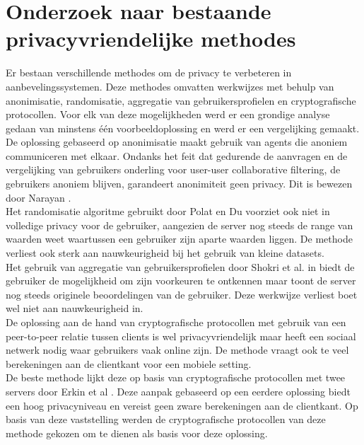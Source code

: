 \documentclass[twocolumn]{phdsymp} %
\begin{document}
\section{Onderzoek naar bestaande privacyvriendelijke methodes}

Er bestaan verschillende methodes om de privacy te verbeteren in aanbevelingssystemen. Deze methodes omvatten werkwijzes met behulp van anonimisatie, randomisatie, aggregatie van gebruikersprofielen en cryptografische protocollen. Voor elk van deze mogelijkheden werd er een grondige analyse gedaan van minstens \'e\'en voorbeeldoplossing en werd er een vergelijking gemaakt. \\ 
De oplossing gebaseerd op anonimisatie \cite{anonimisatie} maakt gebruik van agents die anoniem communiceren met elkaar. Ondanks het feit dat gedurende de aanvragen en de vergelijking van gebruikers onderling voor user-user collaborative filtering, de gebruikers anoniem blijven, garandeert anonimiteit geen privacy. Dit is bewezen door Narayan \cite{anon}.\\Het randomisatie algoritme gebruikt door Polat en Du \cite{rand} voorziet ook niet in volledige privacy voor de gebruiker, aangezien de server nog steeds de range van waarden weet waartussen een gebruiker zijn aparte waarden liggen. De methode verliest ook sterk aan nauwkeurigheid bij het gebruik van kleine datasets.\\  Het gebruik van aggregatie van gebruikersprofielen door Shokri et al. in \cite{agg} biedt de gebruiker de mogelijkheid om zijn voorkeuren te ontkennen maar toont de server nog steeds originele beoordelingen van de gebruiker. Deze werkwijze verliest boet wel niet aan nauwkeurigheid in. \\ De oplossing aan de hand van cryptografische protocollen met gebruik van een peer-to-peer  relatie tussen clients \cite{social} is wel privacyvriendelijk maar heeft een sociaal netwerk nodig waar gebruikers vaak online zijn. De methode vraagt ook te veel berekeningen aan de clientkant voor een mobiele setting.\\ De beste methode lijkt deze op basis van cryptografische protocollen met twee servers door Erkin et al \cite{dyn}. Deze aanpak gebaseerd op een eerdere oplossing \cite{erkin} biedt een hoog privacyniveau en vereist geen zware berekeningen aan de clientkant. Op basis van deze vaststelling werden de cryptografische protocollen van deze methode gekozen om te dienen als basis voor deze oplossing.
\end{document}
